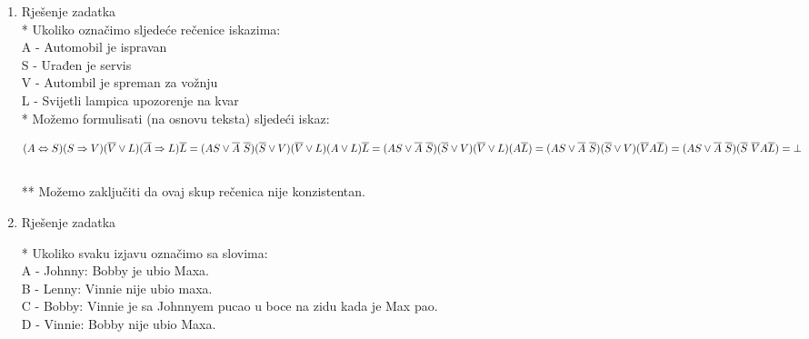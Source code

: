 \documentclass[12pt]{article}
\begin{document}
\begin{enumerate}
		(d) \begin{align*}
		    
		    A \vee (B \veebar C) \vee (C \Rightarrow B) = A \vee (B\overline{C} \vee \overline{B}C)
		    \vee (\overline{C} \vee B) =  A \vee B\overline{C} \vee \overline{B}C
		    \vee \overline{C} \vee B = \\
		    
		    = A \vee  \overline{B}C \vee \overline{C} \vee B =
		    A \vee  \overline{B}C \vee \overline{C} \vee BC \vee B\overline{C} =
		    A \vee C \vee \overline{C} = A \vee \top = \top    
		\end{align*}
		\item Rješenje zadatka
		\\
		
		* Ukoliko označimo sljedeće rečenice iskazima: \\
		
		A - Automobil je ispravan \\
		S - Urađen je servis \\
		V - Autombil je spreman za vožnju \\
		L - Svijetli lampica upozorenje na kvar \\
		
		* Možemo formulisati (na osnovu teksta) sljedeći iskaz: 
		
		\begin{equation*}
		    (A \Leftrightarrow S)(S \Rightarrow V)(\overline{V} \vee L)(\overline{A} \Rightarrow L)\overline{L} = (AS \vee \overline{A}~\overline{S})(\overline{S} \vee V)(\overline{V} \vee L)(A \vee L)\overline{L} = \\
		    
		    (AS \vee \overline{A}~\overline{S})(\overline{S} \vee V)(\overline{V} \vee L)(A\overline{L}) = (AS \vee \overline{A}~\overline{S})(\overline{S} \vee V)(\overline{V}A\overline{L}) = (AS \vee \overline{A}~\overline{S})(\overline{S}~\overline{V}A\overline{L}) = \bot
		\end{equation*} \\
		
		** Možemo zaključiti da ovaj skup rečenica nije konzistentan. \\
		
		
		\newpage
		
		\item Rješenje zadatka
		
		* Ukoliko svaku izjavu označimo sa slovima: \\
		A - Johnny: Bobby je ubio Maxa. \\
		B - Lenny: Vinnie nije ubio maxa. \\
        C - Bobby: Vinnie je sa Johnnyem pucao u boce na zidu kada je Max pao. \\
        D - Vinnie: Bobby nije ubio Maxa. \\
        

\end{enumerate}
\end{document}
